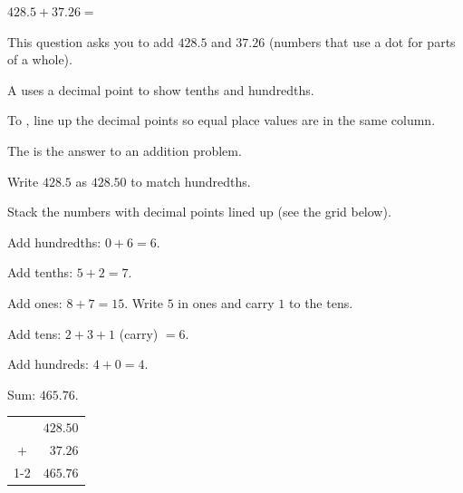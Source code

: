 


\noindent $428.5 + 37.26 = $\ansblank{}


\noindent This question asks you to add $428.5$ and $37.26$ (numbers that use a
dot for parts of a whole).

\begin{words}
  \item A uses a decimal point to show tenths and hundredths.
  \item To \unskip, line up the decimal points so equal place
        values are in the same column.
  \item The is the answer to an addition problem.
\end{words}

\begin{steps}
  \item Write $428.5$ as $428.50$ to match hundredths.
  \item Stack the numbers with decimal points lined up (see the grid below).
  \item Add hundredths: $0 + 6 = 6$.
  \item Add tenths: $5 + 2 = 7$.
  \item Add ones: $8 + 7 = 15$. Write $5$ in ones and carry $1$ to the tens.
  \item Add tens: $2 + 3 + 1$ (carry) $= 6$.
  \item Add hundreds: $4 + 0 = 4$.
  \item Sum: $465.76$.
\end{steps}

\begin{center}
{\setlength{\tabcolsep}{0.15em}%
\begin{tabular}{cr}
      & $428.50$ \\
  $+$ & $37.26$  \\ \cline{1-2}
      & $465.76$ \\
\end{tabular}}
\end{center}

